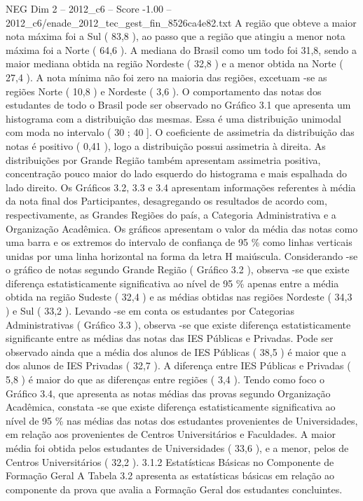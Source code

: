 \begin{textsample}{NEG Dim 2 – 2012\_c6 – Score -1.00 – 2012\_c6/enade\_2012\_tec\_gest\_fin\_8526ca4e82.txt}
A região que obteve a maior nota máxima foi a Sul ( 83,8 ), ao passo que a região que atingiu a menor nota máxima foi a Norte ( 64,6 ).
A mediana do Brasil como um todo foi 31,8, sendo a maior mediana obtida na região Nordeste ( 32,8 ) e a menor obtida na Norte ( 27,4 ).
A nota mínima não foi zero na maioria das regiões, excetuam -se as regiões Norte ( 10,8 ) e Nordeste ( 3,6 ).
O comportamento das notas dos estudantes de todo o Brasil pode ser observado no Gráfico 3.1 que apresenta um histograma com a distribuição das mesmas.
Essa é uma distribuição unimodal com moda no intervalo ( 30 ; 40 ].
O coeficiente de assimetria da distribuição das notas é positivo ( 0,41 ), logo a distribuição possui assimetria à direita.
As distribuições por Grande Região também apresentam assimetria positiva, concentração pouco maior do lado esquerdo do histograma e mais espalhada do lado direito.
Os Gráficos 3.2, 3.3 e 3.4 apresentam informações referentes à média da nota final dos Participantes, desagregando os resultados de acordo com, respectivamente, as Grandes Regiões do país, a Categoria Administrativa e a Organização Acadêmica.
Os gráficos apresentam o valor da média das notas como uma barra e os extremos do intervalo de confiança de 95 \% como linhas verticais unidas por uma linha horizontal na forma da letra H maiúscula.
Considerando -se o gráfico de notas segundo Grande Região ( Gráfico 3.2 ), observa -se que existe diferença estatisticamente significativa ao nível de 95 \% apenas entre a média obtida na região Sudeste ( 32,4 ) e as médias obtidas nas regiões Nordeste ( 34,3 ) e Sul ( 33,2 ).
Levando -se em conta os estudantes por Categorias Administrativas ( Gráfico 3.3 ), observa -se que existe diferença estatisticamente significante entre as médias das notas das IES Públicas e Privadas.
Pode ser observado ainda que a média dos alunos de IES Públicas ( 38,5 ) é maior que a dos alunos de IES Privadas ( 32,7 ).
A diferença entre IES Públicas e Privadas ( 5,8 ) é maior do que as diferenças entre regiões ( 3,4 ).
Tendo como foco o Gráfico 3.4, que apresenta as notas médias das provas segundo Organização Acadêmica, constata -se que existe diferença estatisticamente significativa ao nível de 95 \% nas médias das notas dos estudantes provenientes de Universidades, em relação aos provenientes de Centros Universitários e Faculdades.
A maior média foi obtida pelos estudantes de Universidades ( 33,6 ), e a menor, pelos de Centros Universitários ( 32,2 ). 3.1.2 Estatísticas Básicas no Componente de Formação Geral A Tabela 3.2 apresenta as estatísticas básicas em relação ao componente da prova que avalia a Formação Geral dos estudantes concluintes.

\end{textsample}
